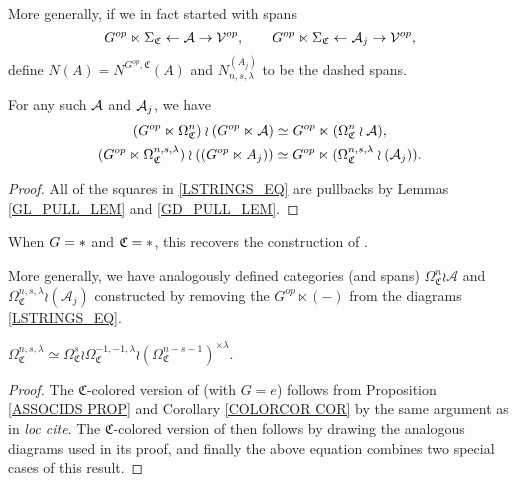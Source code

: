 \documentclass[a4paper,10pt
,draft
]{article}%
\renewcommand{\1}{\eta}%
\newcommand{\SC}{\Sigma_{\mathfrak C}}
\newcommand{\OC}{\Omega_{\mathfrak C}}
\begin{document}
\begin{definition}
      More generally, if we in fact started with spans
      \begin{equation}
            G^{op} \ltimes \SC \leftarrow \A \to \V^{op},
            \qquad
            G^{op} \ltimes \SC \leftarrow \A_j \to \V^{op},
      \end{equation}
      define $N(A) = N^{G^{op},\mathfrak C}(A)$ and $N_{n,s,\lambda}^{(A_j)}$ to be the dashed spans.
\end{definition}


\begin{lemma}
      \label{GWRA_LEM}
      For any such $\mathcal{A}$ and $\mathcal{A}_j$, we have
      \begin{gather*}
            (G^{op} \ltimes \OC^{n}) \wr (G^{op} \ltimes \A) \simeq G^{op} \ltimes (\OC^{n} \wr \A),
            \\
            (G^{op} \ltimes \OC^{n,s,\lambda}) \wr ((G^{op} \ltimes A_j)) \simeq G^{op} \ltimes (\OC^{n,s,\lambda} \wr (\A_j)).
      \end{gather*}
\end{lemma}
\begin{proof}
      All of the squares in \eqref{LSTRINGS_EQ} are pullbacks by Lemmas \ref{GL_PULL_LEM} and \ref{GD_PULL_LEM}.
\end{proof}

When $G = \**$ and $\mathfrak C = \**$, this recovers the construction of \cite[Notation 5.24]{BP_geo}.

More generally, we have analogously defined categories (and spans)
$\Omega_{\mathfrak C}^n \wr \mathcal A$ and $\Omega_{\mathfrak C}^{n,s,\lambda} \wr (\mathcal A_j)$
constructed by removing the $G^{op} \ltimes (-)$ from the diagrams \eqref{LSTRINGS_EQ}.

\begin{lemma}
      $\OC^{n,s,\lambda} \simeq \OC^s \wr \OC^{-1,-1,\lambda} \wr (\OC^{n-s-1})^{\times \lambda}$.
\end{lemma}
\begin{proof}
      The $\mathfrak C$-colored version of \cite[Prop. 5.30]{BP_geo} (with $G = e$)
      follows from Proposition \ref{ASSOCIDS PROP} and Corollary \ref{COLORCOR COR}
      by the same argument as in \textit{loc cite}.
      The $\mathfrak C$-colored version of \cite[Cor. 5.32]{BP_geo} then follows by drawing the analogous diagrams used in its proof,
      and finally the above equation combines two special cases of this result.
\end{proof}
\end{document}
